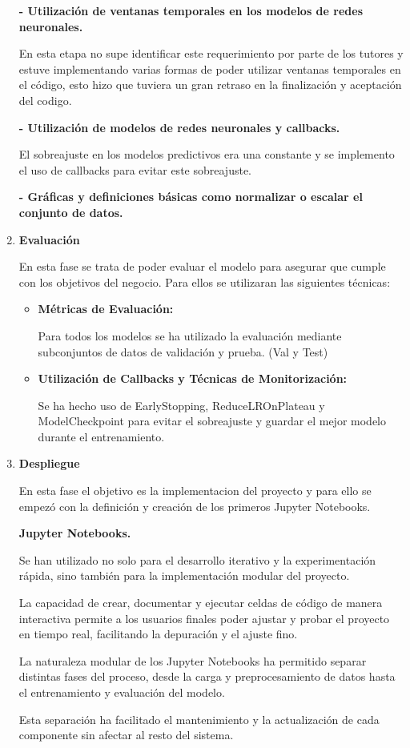 \begin{enumerate}
\textbf{- Utilización de ventanas temporales en los modelos de redes neuronales.} 

	En esta etapa no supe identificar este requerimiento por parte de los tutores y estuve implementando varias formas de poder utilizar ventanas temporales en el código, esto hizo que tuviera un gran retraso en la finalización y aceptación del codigo.

\textbf{- Utilización de modelos de redes neuronales y callbacks.} 

	El sobreajuste en los modelos predictivos era una constante y se implemento el uso de callbacks para evitar este sobreajuste.


\textbf{- Gráficas y definiciones básicas como normalizar o escalar el conjunto de datos.}



\item
\textbf{Evaluación}


En esta fase se trata de poder evaluar el modelo para asegurar que cumple con los objetivos del negocio. Para ellos se utilizaran las siguientes técnicas:


	\begin{itemize}
	
	\item
	\textbf{Métricas de Evaluación:}

Para todos los modelos se ha utilizado la evaluación mediante subconjuntos de datos de validación y prueba. (Val y Test)

	\item
	\textbf{Utilización de Callbacks y Técnicas de Monitorización:}

 Se ha hecho uso de EarlyStopping, ReduceLROnPlateau y ModelCheckpoint para evitar el sobreajuste y guardar el mejor modelo durante el entrenamiento.
	\end{itemize}


\item
\textbf{Despliegue}

En esta fase el objetivo es la implementacion del proyecto y para ello se empezó con la definición y creación de los primeros Jupyter Notebooks.


\textbf{Jupyter Notebooks.} 

Se han utilizado no solo para el desarrollo iterativo y la experimentación rápida, sino también para la implementación modular del proyecto. 

La capacidad de crear, documentar y ejecutar celdas de código de manera interactiva permite a los usuarios finales poder ajustar y probar el proyecto en tiempo real, facilitando la depuración y el ajuste fino.

La naturaleza modular de los Jupyter Notebooks ha permitido separar distintas fases del proceso, desde la carga y preprocesamiento de datos hasta el entrenamiento y evaluación del modelo. 

Esta separación ha facilitado el mantenimiento y la actualización de cada componente sin afectar al resto del sistema.

\end{enumerate}